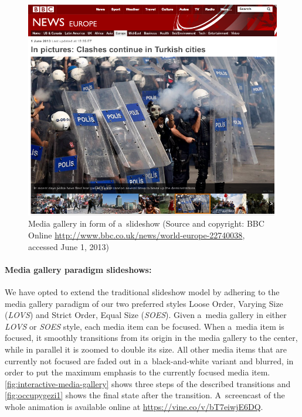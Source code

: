 \begin{figure}[!ht]
  \centering
  \includegraphics[width=0.8\columnwidth]{occupygezibbc.png}
  \caption[Media gallery in form of a~slideshow]{Media gallery in form of a~slideshow
  (Source and copyright: BBC Online \url{http://www.bbc.co.uk/news/world-europe-22740038}, accessed June 1, 2013)}
  \label{fig:occupygezibbc}
\end{figure}

\paragraph{Media gallery paradigm slideshows:}

We have opted to extend the traditional slideshow model
by adhering to the media gallery paradigm of our two preferred styles
Loose Order, Varying Size (\emph{LOVS}) and Strict Order, Equal Size (\emph{SOES}).
Given a~media gallery in either \emph{LOVS} or \emph{SOES} style,
each media item can be focused.
When a~media item is focused, it smoothly transitions
from its origin in the media gallery to the center,
while in parallel it is zoomed to double its size.
All other media items that are currently not focused are faded out
in a~black-and-white variant and blurred, in order to put the maximum emphasis
to the currently focused media item.
\autoref{fig:interactive-media-gallery} shows three steps of the described transitions and
\autoref{fig:occupygezi1} shows the final state after the transition.
A~screencast of the whole animation is available online at \url{https://vine.co/v/bT7eiwjE6DQ}.

